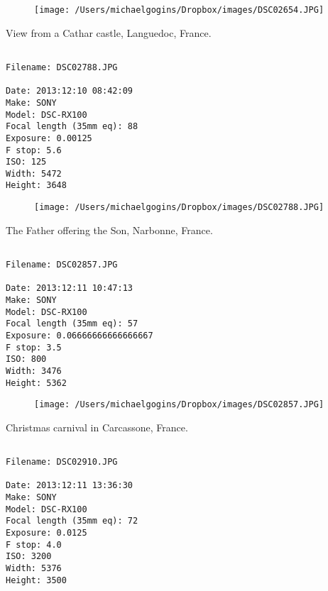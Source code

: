 \documentclass[11pt,letter,DIV=14,paper=landscape]{scrbook}
\begin{document}
\begin{figure}
\texttt{[image: /Users/michaelgogins/Dropbox/images/DSC02654.JPG]}
\end{figure}
    
\clearpage
\noindent View from a Cathar castle, Languedoc, France.
\noindent
\begin{lstlisting}

Filename: DSC02788.JPG

Date: 2013:12:10 08:42:09
Make: SONY
Model: DSC-RX100
Focal length (35mm eq): 88
Exposure: 0.00125
F stop: 5.6
ISO: 125
Width: 5472
Height: 3648
\end{lstlisting}
\clearpage

\begin{figure}
\texttt{[image: /Users/michaelgogins/Dropbox/images/DSC02788.JPG]}
\end{figure}
    
\clearpage
\noindent The Father offering the Son, Narbonne, France.
\noindent
\begin{lstlisting}

Filename: DSC02857.JPG

Date: 2013:12:11 10:47:13
Make: SONY
Model: DSC-RX100
Focal length (35mm eq): 57
Exposure: 0.06666666666666667
F stop: 3.5
ISO: 800
Width: 3476
Height: 5362
\end{lstlisting}
\clearpage

\begin{figure}
\texttt{[image: /Users/michaelgogins/Dropbox/images/DSC02857.JPG]}
\end{figure}
    
\clearpage
\noindent Christmas carnival in Carcassone, France.
\noindent
\begin{lstlisting}

Filename: DSC02910.JPG

Date: 2013:12:11 13:36:30
Make: SONY
Model: DSC-RX100
Focal length (35mm eq): 72
Exposure: 0.0125
F stop: 4.0
ISO: 3200
Width: 5376
Height: 3500
\end{lstlisting}
\clearpage
\end{document}
